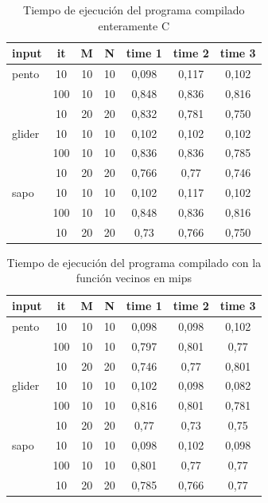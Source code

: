 \documentclass[11pt,a4paper]{article}
\begin{document}
\begin{table}[H]
	\centering
	\begin{tabular}{|l|c|c|c|c|c|c|}
		\hline
		\textbf{input}&\textbf{it}&\textbf{M}&\textbf{N} &\textbf{time 1}&\textbf{time 2}&\textbf{time 3}\\
		\hline
		pento &	10	&10	&10	&0,098	&0,117	&0,102\\
		      & 100	&10	&10	&0,848	&0,836	&0,816\\
		      & 10	&20	&20	&0,832	&0,781	&0,750\\
		\hline
		glider& 10	&10	&10	&0,102	&0,102	&0,102\\
		      & 100	&10	&10	&0,836	&0,836	&0,785\\
		      & 10	&20	&20	&0,766	&0,77	&0,746\\
		\hline
		sapo  &	10	&10	&10	&0,102	&0,117	&0,102\\
		      & 100	&10	&10	&0,848	&0,836	&0,816\\
		      & 10	&20	&20	&0,73	&0,766	&0,750\\
		\hline
	\end{tabular}
	\caption{Tiempo de ejecución del programa compilado enteramente C}
	\label{tab:t_c}
\end{table}

\begin{table}[H]
	\centering
	\begin{tabular}{|l|c|c|c|c|c|c|}
		\hline
		\textbf{input}&\textbf{it}&\textbf{M}&\textbf{N} &\textbf{time 1}&\textbf{time 2}&\textbf{time 3}\\
		\hline
		pento	&10	 &10	&10 &0,098	&0,098	&0,102\\
				&100 &10	&10 &0,797	&0,801	&0,77\\
				&10	 &20	&20 &0,746	&0,77	&0,801\\
				\hline
		glider	&10	 &10	&10 &0,102	&0,098	&0,082\\
				&100 &10	&10	&0,816	&0,801	&0,781\\
				&10	 &20	&20	&0,77	&0,73	&0,75\\
				\hline
		sapo	&10	 &10	&10	&0,098	&0,102	&0,098\\
				&100 &10	&10	&0,801	&0,77	&0,77\\
				&10	 &20	&20	&0,785	&0,766	&0,77\\
		\hline
	\end{tabular}
	\caption{Tiempo de ejecución del programa compilado con la función vecinos en mips}
	\label{tab:t_mips}
\end{table}
\end{document}

